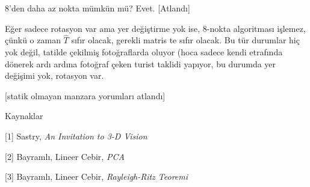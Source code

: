 \documentclass[12pt,fleqn]{article}\usepackage{../../common}
\begin{document}
8'den daha az nokta mümkün mü? Evet. [Atlandı]

Eğer sadece rotasyon var ama yer değiştirme yok ise, 8-nokta algoritması
işlemez, çünkü o zaman $\hat{T}$ sıfır olacak, gerekli matris te sıfır
olacak. Bu tür durumlar hiç yok değil, tatilde çekilmiş fotoğraflarda oluyor
(hoca sadece kendi etrafında dönerek ardı ardına fotoğraf çeken turist taklidi
yapıyor, bu durumda yer değişimi yok, rotasyon var.

[statik olmayan manzara yorumları atlandı]

Kaynaklar 

[1] Sastry, {\em An Invitation to 3-D Vision}

[2] Bayramlı, Lineer Cebir, {\em PCA}

[3] Bayramlı, Lineer Cebir, {\em Rayleigh-Ritz Teoremi}
\end{document}
